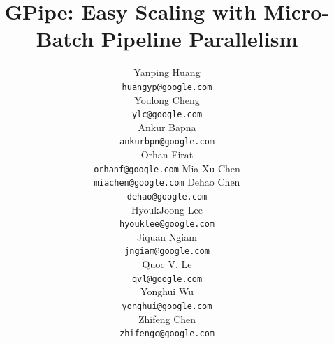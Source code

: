\documentclass{article}
\def\codename{GPipe}
\begin{document}
\title{\codename{}: Easy Scaling with Micro-Batch Pipeline Parallelism}

% 


\author{
Yanping Huang\\
\texttt{huangyp@google.com} \\
\And
Youlong Cheng\\
\texttt{ylc@google.com} \\
\And 
Ankur Bapna \\
\texttt{ankurbpn@google.com} \\
\And
Orhan Firat \\
\texttt{orhanf@google.com}
\And
Mia Xu Chen \\
\texttt{miachen@google.com}
\And
Dehao Chen\\
\texttt{dehao@google.com} \\
\And
HyoukJoong Lee\\
\texttt{hyouklee@google.com} \\
\And
Jiquan Ngiam\\
\texttt{jngiam@google.com}\\
\And
Quoc V. Le \\
\texttt{qvl@google.com}\\
\And
Yonghui Wu\\
\texttt{yonghui@google.com} \\
\And
Zhifeng Chen\\
\texttt{zhifengc@google.com}\\
}

\maketitle
\end{document}
